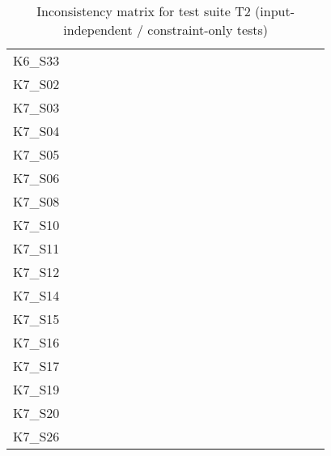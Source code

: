 \begin{table}[htpb]
\begin{tabular}{l|rrrrrrrrrrrrrrrrrrrr}
        K6\_S33 & \y & \y & \y & \y & \y & \y & \y & \y & \y & \y & \y & \x & \y & \y & \x & \y & \y & \y & \y & \y \\
        K7\_S02 & \y & \y & \y & \y & \y & \y & \y & \y & \y & \y & \y & \y & \y & \y & \y & \y & \y & \y & \y & \y \\
        K7\_S03 & \y & \y & \y & \y & \y & \y & \y & \y & \y & \y & \y & \y & \y & \y & \y & \y & \y & \y & \y & \y \\
        K7\_S04 & \y & \y & \y & \y & \y & \y & \y & \y & \y & \y & \y & \y & \y & \y & \y & \y & \y & \y & \y & \y \\
        K7\_S05 & \y & \y & \y & \y & \y & \y & \y & \y & \y & \y & \y & \y & \y & \y & \y & \y & \y & \y & \y & \y \\
        K7\_S06 & \y & \y & \y & \y & \y & \y & \y & \y & \y & \y & \y & \y & \y & \y & \y & \y & \y & \y & \y & \y \\
        K7\_S08 & \y & \y & \y & \y & \y & \y & \y & \y & \y & \y & \y & \x & \y & \y & \y & \y & \y & \y & \y & \y \\
        K7\_S10 & \y & \y & \y & \y & \y & \y & \y & \y & \y & \y & \y & \y & \y & \y & \y & \y & \y & \y & \y & \y \\
        K7\_S11 & \y & \y & \y & \y & \y & \y & \y & \y & \y & \y & \y & \y & \y & \y & \y & \y & \y & \y & \y & \y \\
        K7\_S12 & \y & \y & \y & \y & \y & \y & \y & \y & \y & \y & \y & \y & \y & \y & \y & \y & \y & \y & \y & \y \\
        K7\_S14 & \y & \y & \y & \y & \y & \y & \y & \y & \y & \y & \y & \y & \y & \y & \y & \y & \y & \y & \y & \y \\
        K7\_S15 & \y & \y & \y & \y & \y & \y & \y & \y & \y & \y & \y & \y & \y & \y & \y & \y & \y & \y & \y & \y \\
        K7\_S16 & \y & \x & \y & \y & \y & \y & \y & \y & \y & \y & \y & \y & \y & \y & \y & \y & \y & \y & \y & \y \\
        K7\_S17 & \y & \y & \y & \y & \x & \y & \y & \y & \y & \y & \y & \y & \y & \y & \y & \y & \x & \y & \y & \y \\
        K7\_S19 & \y & \y & \y & \y & \y & \y & \y & \y & \y & \y & \y & \y & \y & \y & \y & \y & \y & \y & \y & \y \\
        K7\_S20 & \y & \y & \y & \y & \y & \y & \y & \y & \y & \y & \y & \y & \y & \y & \x & \y & \y & \y & \y & \y \\
        K7\_S26 & \y & \y & \y & \y & \y & \y & \y & \y & \y & \y & \y & \y & \y & \y & \y & \y & \y & \y & \y & \y \\
        \bottomrule
    \end{tabular}
    \caption{Inconsistency matrix for test suite T2 (input-independent / constraint-only tests)}
    \label{tab:inconsistencies_matrix_constraint}
    \setlength{\tabcolsep}{\defaulttabcolsep}
\end{table}

